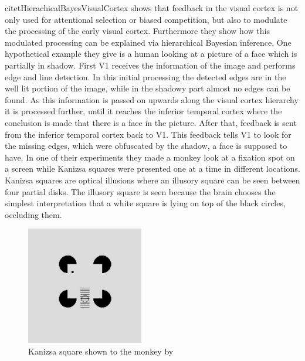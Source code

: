 citet{HierachicalBayesVisualCortex} shows that feedback in the visual cortex is not only used for attentional selection or biased competition, but also to modulate the processing of the early visual cortex. Furthermore they show how this modulated processing can be explained via hierarchical Bayesian inference. One hypothetical example they give is a human looking at a picture of a face which is partially in shadow. First V1 receives the information of the image and performs edge and line detection. In this initial processing the detected edges are in the well lit portion of the image, while in the shadowy part almost no edges can be found. As this information is passed on upwards along the visual cortex hierarchy it is processed further, until it reaches the inferior temporal cortex where the conclusion is made that there is a face in the picture. After that, feedback is sent from the inferior temporal cortex back to V1. This feedback tells V1 to look for the missing edges, which were obfuscated by the shadow, a face is supposed to have. 
In one of their experiments they made a monkey look at a fixation spot on a screen while Kanizsa squares were presented one at a time in different locations. Kanizsa squares are optical illusions where an illusory square can be seen between four partial disks. The illusory square is seen because the brain chooses the simplest interpretation that a white square is lying on top of the black circles, occluding them.
\begin{figure}
  \includegraphics[width=\linewidth]{figures/kanizsaSquare.PNG}
  \caption{Kanizsa square shown to the monkey by \citet{HierachicalBayesVisualCortex}}
  \label{fig:KanizsaSquare}
\end{figure}
